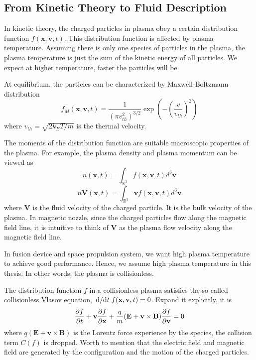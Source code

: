\subsection{From Kinetic Theory to Fluid Description}
In kinetic theory, the charged particles in plasma obey a certain distribution function $f(\mathbf{x}, \mathbf{v}, t)$. This distribution function is affected by plasma temperature. Assuming there is only one species of particles in the plasma, the plasma temperature is just the sum of the kinetic energy of all particles. We expect at higher temperature, faster the particles will be.

At equilibrium, the particles can be characterized by Maxwell-Boltzmann distribution
\[ f_M(\mathbf{x}, \mathbf{v}, t) = \frac{1}{(\pi v_{th}^2)^{3/2}} \exp(-\left(\frac{v}{v_{th}}\right)^2) \]
where $v_{th} = \sqrt{2k_BT/m}$ is the thermal velocity.

The moments of the distribution function are suitable macroscopic properties of the plasma. For example, the plasma density and plasma momentum can be viewed as 
\[ n(\mathbf{x}, t) = \int_{\mathbb{R}^3} f(\mathbf{x}, \mathbf{v}, t) d^3\mathbf{v} \]
\[ n\mathbf{V}(\mathbf{x}, t) = \int_{\mathbb{R}^3} \mathbf{v}f(\mathbf{x}, \mathbf{v}, t) d^3\mathbf{v} \]
where $\mathbf{V}$ is the fluid velocity of the charged particle. It is the bulk velocity of the plasma. In magnetic nozzle, since the charged particles flow along the magnetic field line, it is intuitive to think of $\mathbf{V}$ as the plasma flow velocity along the magnetic field line.

In fusion device and space propulsion system, we want high plasma temperature to achieve good performance. Hence, we assume high plasma temperature in this thesis. In other words, the plasma is collisionless. 

The distribution function $f$ in a collisionless plasma satisfies the so-called collisionless Vlasov equation, $\dv*{t} f(\mathbf{x}, \mathbf{v}, t) = 0$. Expand it explicitly, it is
\begin{equation} \label{eq:vlasov}
	\pdv{f}{t} + \mathbf{v}\pdv{f}{\mathbf{x}} + \frac{q}{m}(\mathbf{E} + \mathbf{v}\times\mathbf{B})\pdv{f}{\mathbf{v}} = 0
\end{equation}
where $q(\mathbf{E} + \mathbf{v}\times\mathbf{B})$ is the Lorentz force experience by the species, the collision term $C(f)$ is dropped. Worth to mention that the electric field and magnetic field are generated by the configuration and the motion of the charged particles.

